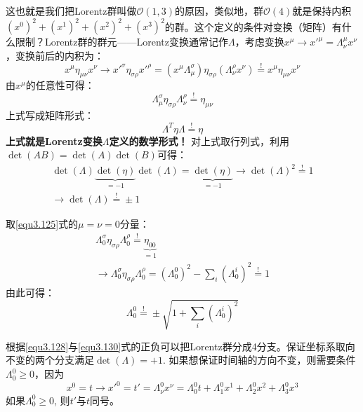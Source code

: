这也就是我们把Lorentz群叫做$\mathcal{O}(1, 3)$的原因，类似地，群$\mathcal{O}(4)$就是保持内积$ (x^0)^2 + (x^1)^2 + (x^2)^2 + (x^3)^2$的群。这个定义的条件对变换（矩阵）有什么限制？Lorentz群的群元——Lorentz变换通常记作$\Lambda$，考虑变换$x^\mu \rightarrow x'^\mu = \Lambda^\mu_\nu x^\nu$，变换前后的内积为：
\begin{equation}
\label{equ3.124}
x^\mu \eta_{\mu \nu} x^\nu \rightarrow x'^\sigma \eta_{\sigma \rho} x'^\rho = (x^\mu \Lambda^\sigma_\mu) \eta_{\sigma \rho} (\Lambda^\rho_\nu x^\nu) \stackrel{!}{=} x^\mu \eta_{\mu \nu} x^\nu
\end{equation}
由$x^{\mu}$的任意性可得：
\begin{equation}
\label{equ3.125}
\Lambda^\sigma_\mu \eta_{\sigma \rho} \Lambda^\rho_\nu \stackrel{!}{=} \eta_{\mu \nu}
\end{equation}
上式写成矩阵形式：
\begin{equation}
\label{equ3.126}
\Lambda^T \eta \Lambda \stackrel{!}{=} \eta
\end{equation}
{\bfseries 上式就是Lorentz变换$\Lambda$定义的数学形式！} 对上式取行列式，利用$\det(AB) = \det(A) \det(B)$可得：
\begin{align}
\label{equ3.127}
\det(\Lambda) \underbrace{\det(\eta)}_{= -1} \det(\Lambda) = \underbrace{\det(\eta)}_{= -1} \rightarrow \det(\Lambda)^2 \stackrel{!}{=} 1 \\
\label{equ3.128}
\rightarrow \det(\Lambda) \stackrel{!}{=} \pm 1
\end{align}

取\eqref{equ3.125}式的$\mu = \nu = 0$分量：
\begin{align}
	\Lambda_0^\sigma \eta_{\sigma \rho} \Lambda_0^\rho \stackrel{!}{=} \underbrace{\eta_{00}}_{=1} \nonumber \\
	\label{equ3.129}
	\rightarrow \Lambda_0^\sigma \eta_{\sigma \rho} \Lambda_0^\rho = (\Lambda_0^0)^2 - \sum_i (\Lambda_0^i)^2 \stackrel{!}{=} 1
\end{align}
由此可得：
\begin{equation}
	\label{equ3.130}
	\Lambda_0^0 \stackrel{!}{=} \pm \sqrt{1 + \sum_i (\Lambda_0^i)^2}
\end{equation}

根据\eqref{equ3.128}与\eqref{equ3.130}式的正负可以把Lorentz群分成4分支。保证坐标系取向不变的两个分支满足$\det (\Lambda) = +1$. 如果想保证时间轴的方向不变，则需要条件$\Lambda_0^0 \geq 0$，因为
\begin{equation}
	\label{equ3.131}
	x^0 = t \rightarrow x'^0 = t' = \Lambda_\nu^0 x^\nu = \Lambda_0^0 t + \Lambda_1^0 x^1 + \Lambda_2^0 x^2 + \Lambda_3^0 x^3
\end{equation}
如果$\Lambda_0^0 \geq 0$, 则$t'$与$t$同号。

